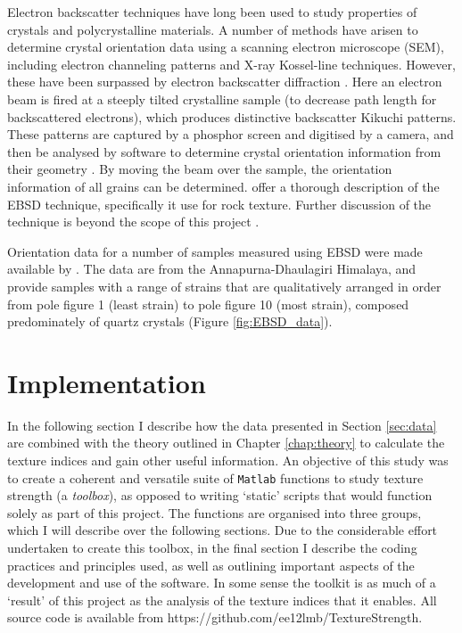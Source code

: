 \documentclass[a4paper,12pt,twoside]{report}
\numberwithin{equation}{chapter}
\begin{document}
    
Electron backscatter techniques have long been used to study properties of crystals and polycrystalline materials. A number of methods have arisen to determine crystal orientation data using a scanning electron microscope (SEM), including electron channeling patterns and X-ray Kossel-line techniques. However, these have been surpassed by electron backscatter diffraction \citep[EBSD or backscatter Kikuchi diffraction,][]{Harland1973}.  Here an electron beam is fired at a steeply tilted crystalline sample (to decrease path length for backscattered electrons), which produces distinctive backscatter Kikuchi patterns. These patterns are captured by a phosphor screen and digitised by a camera, and then be analysed by software to determine crystal orientation information from their geometry  \citep{Zaefferer2007}. By moving the beam over the sample, the orientation information of all grains can be determined. \cite{Prior1999} offer a thorough description of the EBSD technique, specifically it use for rock texture. Further discussion of the technique is beyond the scope of this project \citep[see][for more info]{Schwarzer1997,Randle2000}.    

Orientation data for a number of samples measured using EBSD were made available by \cite{ParsonsThesis}. The data are from the Annapurna-Dhaulagiri Himalaya, and provide samples with a range of strains that are qualitatively arranged in order from pole figure 1 (least strain) to pole figure 10 (most strain), composed predominately of quartz crystals (Figure \ref{fig:EBSD_data}). 



\section{Implementation}

In the following section I describe how the data presented in Section \ref{sec:data} are combined with the theory outlined in Chapter \ref{chap:theory} to calculate the texture indices and gain other useful information. An objective of this study was to create a coherent and versatile suite of \texttt{Matlab} functions to study texture strength (a \emph{toolbox}), as opposed to writing \lq{}static\rq{} scripts that would function solely as part of this project. The functions are organised into three groups, which I will describe over the following sections. Due to the considerable effort undertaken to create this toolbox, in the final section I describe the coding practices and principles used, as well as outlining important aspects of the development and use of the software. In some sense the toolkit is as much of a \lq{}result\rq{} of this project as the analysis of the texture indices that it enables. All source code is available from https://github.com/ee12lmb/TextureStrength.                                                                                                     
\end{document}
